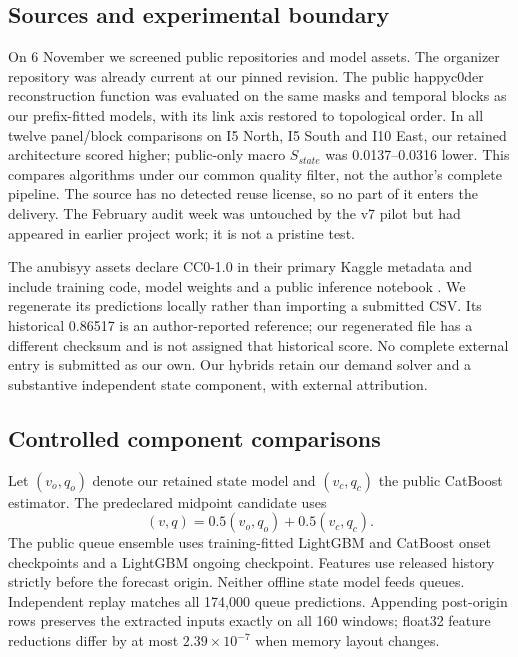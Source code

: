 \documentclass[conference]{IEEEtran}
\begin{document}
\subsection{Sources and experimental boundary}
On 6 November we screened public repositories and model assets. The organizer
repository was already current at our pinned revision. The public
happyc0der reconstruction function was evaluated on the same masks and temporal
blocks as our prefix-fitted models, with its link axis restored to topological
order. In all twelve panel/block comparisons on I5 North, I5 South and I10 East,
our retained architecture scored higher; public-only macro $S_{state}$ was
0.0137--0.0316 lower. This compares algorithms under our common quality filter,
not the author's complete pipeline. The source has no detected reuse license,
so no part of it enters the delivery. The February audit week was untouched by
the v7 pilot but had appeared in earlier project work; it is not a pristine test.

The anubisyy assets declare CC0-1.0 in their primary Kaggle metadata and include
training code, model weights and a public inference notebook \cite{anubis}.
We regenerate its predictions locally rather than importing a submitted CSV.
Its historical 0.86517 is an author-reported reference; our regenerated file has
a different checksum and is not assigned that historical score. No complete
external entry is submitted as our own. Our hybrids retain our demand solver
and a substantive independent state component, with external attribution.

\subsection{Controlled component comparisons}
Let $(v_o,q_o)$ denote our retained state model and $(v_c,q_c)$ the public
CatBoost estimator. The predeclared midpoint candidate uses
\begin{equation}
(v,q)=0.5(v_o,q_o)+0.5(v_c,q_c).
\end{equation}
The public queue ensemble uses training-fitted LightGBM and CatBoost onset
checkpoints and a LightGBM ongoing checkpoint. Features use released history
strictly before the forecast origin. Neither offline state model feeds queues.
Independent replay matches all 174,000 queue predictions. Appending post-origin
rows preserves the extracted inputs exactly on all 160 windows; float32 feature
reductions differ by at most $2.39\times10^{-7}$ when memory layout changes.
\end{document}
